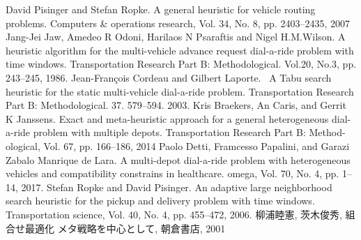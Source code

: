 \documentclass[uplatex]{ujreport}
\begin{document}
\begin{thebibliography}{99}
   David Pisinger and Stefan Ropke. A general heuristic for vehicle routing problems. Computers & operations research, Vol. 34, No. 8, pp. 2403--2435, 2007
  Jang-Jei Jaw, Amedeo R Odoni, Harilaos N Psaraftis and Nigel H.M.Wilson. A heuristic algorithm for the multi-vehicle advance request dial-a-ride problem with time windows. Transportation Research Part B: Methodological. Vol.20, No.3, pp. 243--245, 1986.
  Jean-François Cordeau and Gilbert Laporte.  \, A Tabu search heuristic for the static multi-vehicle dial-a-ride problem. Transportation Research Part B: Methodological. 37. 579--594. 2003.
  Kris Braekers, An Caris, and Gerrit K Janssens. Exact and meta-heuristic approach for a general heterogeneous dial-a-ride problem with multiple depots. Transportation Research Part B: Method- ological, Vol. 67, pp. 166--186, 2014
  Paolo Detti, Framcesso Papalini, and Garazi Zabalo Manrique de Lara. A multi-depot dial-a-ride problem with heterogeneous vehicles and compatibility constrains in healthcare. omega, Vol. 70, No. 4, pp. 1--14, 2017.
  Stefan Ropke and David Pisinger. An adaptive large neighborhood search heuristic for the pickup and delivery problem with time windows. Transportation science, Vol. 40, No. 4, pp. 455--472, 2006.
  柳浦睦憲, 茨木俊秀, 組合せ最適化 メタ戦略を中心として, 朝倉書店, 2001
\end{thebibliography}
\end{document}
